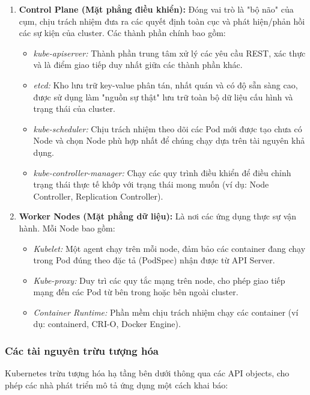 \begin{enumerate}
    \item \textbf{Control Plane (Mặt phẳng điều khiển):} Đóng vai trò là "bộ não" của cụm, chịu trách nhiệm đưa ra các quyết định toàn cục và phát hiện/phản hồi các sự kiện của cluster. Các thành phần chính bao gồm:
    \begin{itemize}
        \item \textit{kube-apiserver:} Thành phần trung tâm xử lý các yêu cầu REST, xác thực và là điểm giao tiếp duy nhất giữa các thành phần khác.
        \item \textit{etcd:} Kho lưu trữ key-value phân tán, nhất quán và có độ sẵn sàng cao, được sử dụng làm "nguồn sự thật" lưu trữ toàn bộ dữ liệu cấu hình và trạng thái của cluster.
        \item \textit{kube-scheduler:} Chịu trách nhiệm theo dõi các Pod mới được tạo chưa có Node và chọn Node phù hợp nhất để chúng chạy dựa trên tài nguyên khả dụng.
        \item \textit{kube-controller-manager:} Chạy các quy trình điều khiển để điều chỉnh trạng thái thực tế khớp với trạng thái mong muốn (ví dụ: Node Controller, Replication Controller).
    \end{itemize}
    
    \item \textbf{Worker Nodes (Mặt phẳng dữ liệu):} Là nơi các ứng dụng thực sự vận hành. Mỗi Node bao gồm:
    \begin{itemize}
        \item \textit{Kubelet:} Một agent chạy trên mỗi node, đảm bảo các container đang chạy trong Pod đúng theo đặc tả (PodSpec) nhận được từ API Server.
        \item \textit{Kube-proxy:} Duy trì các quy tắc mạng trên node, cho phép giao tiếp mạng đến các Pod từ bên trong hoặc bên ngoài cluster.
        \item \textit{Container Runtime:} Phần mềm chịu trách nhiệm chạy các container (ví dụ: containerd, CRI-O, Docker Engine).
    \end{itemize}
\end{enumerate}



\subsubsection{Các tài nguyên trừu tượng hóa}
Kubernetes trừu tượng hóa hạ tầng bên dưới thông qua các API objects, cho phép các nhà phát triển mô tả ứng dụng một cách khai báo:


